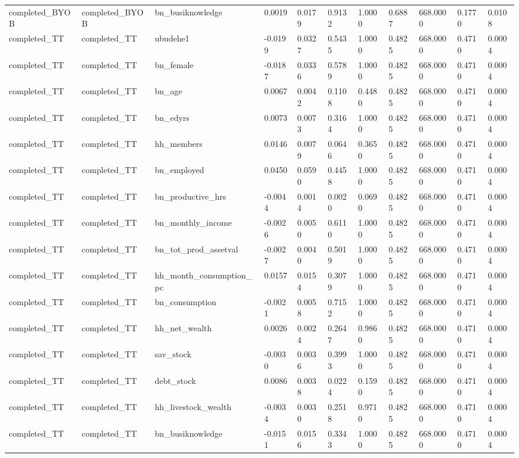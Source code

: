 \begin{tabular}{lllllllllll}
completed\_BYOB & completed\_BYOB & bn\_busiknowledge & 0.0019 & 0.0179 & 0.9132 & 1.0000 & 0.6887 & 668.0000 & 0.1770 & 0.0108 \\
completed\_TT & completed\_TT & ubudehe1 & -0.0199 & 0.0327 & 0.5435 & 1.0000 & 0.4825 & 668.0000 & 0.4710 & 0.0004 \\
completed\_TT & completed\_TT & bn\_female & -0.0187 & 0.0336 & 0.5789 & 1.0000 & 0.4825 & 668.0000 & 0.4710 & 0.0004 \\
completed\_TT & completed\_TT & bn\_age & 0.0067 & 0.0042 & 0.1108 & 0.4480 & 0.4825 & 668.0000 & 0.4710 & 0.0004 \\
completed\_TT & completed\_TT & bn\_edyrs & 0.0073 & 0.0073 & 0.3164 & 1.0000 & 0.4825 & 668.0000 & 0.4710 & 0.0004 \\
completed\_TT & completed\_TT & hh\_members & 0.0146 & 0.0079 & 0.0646 & 0.3650 & 0.4825 & 668.0000 & 0.4710 & 0.0004 \\
completed\_TT & completed\_TT & bn\_employed & 0.0450 & 0.0590 & 0.4458 & 1.0000 & 0.4825 & 668.0000 & 0.4710 & 0.0004 \\
completed\_TT & completed\_TT & bn\_productive\_hrs & -0.0044 & 0.0014 & 0.0020 & 0.0690 & 0.4825 & 668.0000 & 0.4710 & 0.0004 \\
completed\_TT & completed\_TT & bn\_monthly\_income & -0.0026 & 0.0050 & 0.6110 & 1.0000 & 0.4825 & 668.0000 & 0.4710 & 0.0004 \\
completed\_TT & completed\_TT & bn\_tot\_prod\_assetval & -0.0027 & 0.0040 & 0.5019 & 1.0000 & 0.4825 & 668.0000 & 0.4710 & 0.0004 \\
completed\_TT & completed\_TT & hh\_month\_consumption\_pc & 0.0157 & 0.0154 & 0.3079 & 1.0000 & 0.4825 & 668.0000 & 0.4710 & 0.0004 \\
completed\_TT & completed\_TT & bn\_consumption & -0.0021 & 0.0058 & 0.7152 & 1.0000 & 0.4825 & 668.0000 & 0.4710 & 0.0004 \\
completed\_TT & completed\_TT & hh\_net\_wealth & 0.0026 & 0.0024 & 0.2647 & 0.9860 & 0.4825 & 668.0000 & 0.4710 & 0.0004 \\
completed\_TT & completed\_TT & sav\_stock & -0.0030 & 0.0036 & 0.3993 & 1.0000 & 0.4825 & 668.0000 & 0.4710 & 0.0004 \\
completed\_TT & completed\_TT & debt\_stock & 0.0086 & 0.0038 & 0.0224 & 0.1590 & 0.4825 & 668.0000 & 0.4710 & 0.0004 \\
completed\_TT & completed\_TT & hh\_livestock\_wealth & -0.0034 & 0.0030 & 0.2518 & 0.9710 & 0.4825 & 668.0000 & 0.4710 & 0.0004 \\
completed\_TT & completed\_TT & bn\_busiknowledge & -0.0151 & 0.0156 & 0.3343 & 1.0000 & 0.4825 & 668.0000 & 0.4710 & 0.0004 \\
\bottomrule
\end{tabular}
